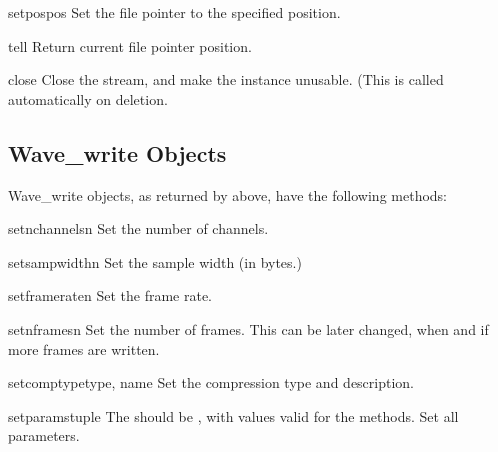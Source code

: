 \begin{methoddesc}{setpos}{pos}
Set the file pointer to the specified position.
\end{methoddesc}

\begin{methoddesc}{tell}{}
Return current file pointer position.
\end{methoddesc}

\begin{methoddesc}{close}{}
Close the stream, and make the instance unusable. (This is
called automatically on deletion.
\end{methoddesc}


\subsection{Wave_write Objects \label{Wave-write-objects}}

Wave_write objects, as returned by  above, have the
following methods:

\begin{methoddesc}{setnchannels}{n}
Set the number of channels.
\end{methoddesc}

\begin{methoddesc}{setsampwidth}{n}
Set the sample width (in bytes.)
\end{methoddesc}

\begin{methoddesc}{setframerate}{n}
Set the frame rate.
\end{methoddesc}

\begin{methoddesc}{setnframes}{n}
Set the number of frames. This can be later changed, when and if more
frames are written.
\end{methoddesc}

\begin{methoddesc}{setcomptype}{type, name}
Set the compression type and description.
\end{methoddesc}

\begin{methoddesc}{setparams}{tuple}
The  should be
, with values valid for
the  methods.  Set all parameters.
\end{methoddesc}

